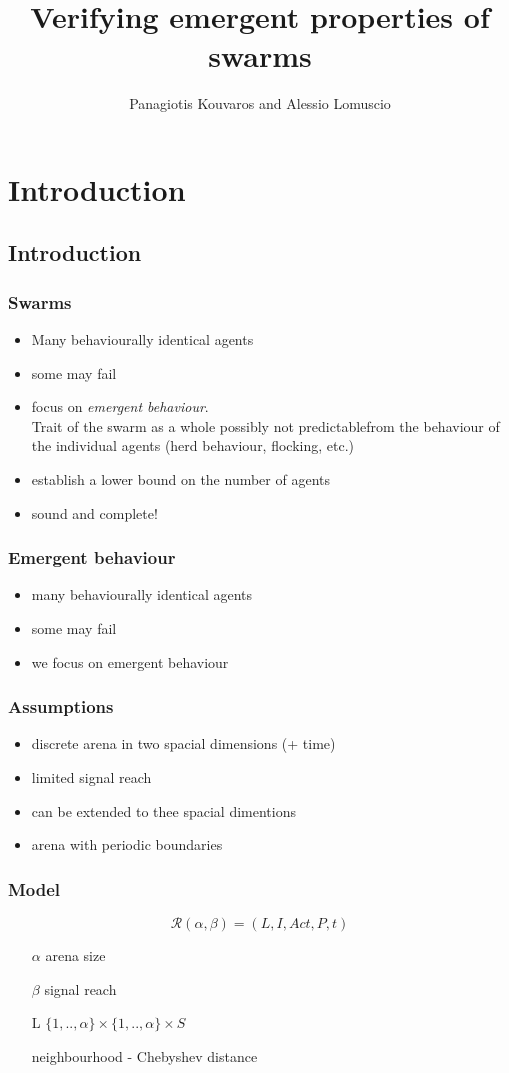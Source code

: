 \documentclass[hyperref={pdfpagelabels=false}]{beamer}
\title{ Verifying emergent properties of swarms }
\author{Panagiotis Kouvaros and Alessio Lomuscio }
\date{}
\begin{document}
\begin{frame}
\titlepage
\end{frame}

\section{Introduction}

\subsection{Introduction}
\begin{frame}
\frametitle{Swarms}
\begin{itemize}
\item Many behaviourally identical agents
\item some may fail
\item focus on {\it emergent behaviour}.\\
  Trait of the swarm as a whole possibly not predictablefrom the behaviour of the individual agents (herd behaviour, flocking, etc.)
\item establish a lower bound on the number of agents
\item sound and complete!
\end{itemize}
\end{frame}

\begin{frame}
\frametitle{Emergent behaviour}
\begin{itemize}

\item many behaviourally identical agents
\item some may fail
\item we focus on emergent behaviour
\end{itemize}
\end{frame}


\begin{frame}
\frametitle{Assumptions}
\begin{itemize}
\item discrete arena in two spacial dimensions (+ time)
\item limited signal reach
\item can be extended to thee spacial dimentions
\item arena with periodic boundaries
\end{itemize}
\end{frame}


\begin{frame}
  \frametitle{ Model }
    $$\mathcal{R}(\alpha , \beta ) = (L, I, Act, P, t)$$
\begin{itemize}
\item[$\alpha$] arena size
\item[$\beta$] signal reach
\item[L] $\{1,..,\alpha\} \times \{1,..,\alpha\} \times S$
\item[]  neighbourhood - Chebyshev distance
\end{itemize}
\end{frame}
\end{document}
